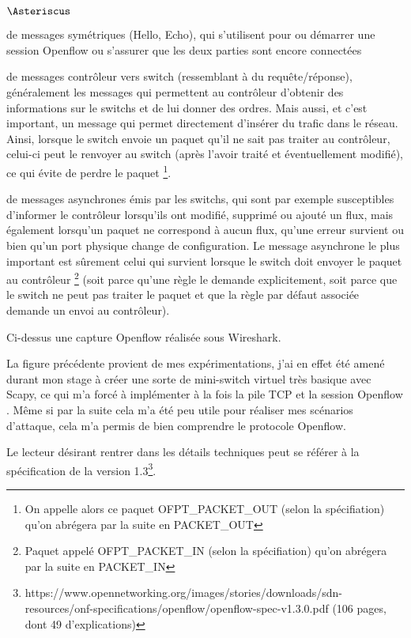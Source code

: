 \begin{list}{$\Asteriscus$}{}

\item de messages symétriques (Hello, Echo), qui s'utilisent pour ou démarrer une session Openflow ou s'assurer que les deux parties sont encore connectées

\item de messages contrôleur vers switch (ressemblant à du requête/réponse), généralement les messages qui permettent au contrôleur d'obtenir des informations sur le switchs et de lui donner des ordres. Mais aussi, et c'est important, un message qui permet directement d'insérer du trafic dans le réseau. Ainsi, lorsque le switch envoie un paquet qu'il ne sait pas traiter au contrôleur, celui-ci peut le renvoyer au switch (après l'avoir traité et éventuellement modifié), ce qui évite de perdre le paquet \footnote{On appelle alors ce paquet OFPT\_PACKET\_OUT (selon la spécifiation) qu'on abrégera par la suite en PACKET\_OUT}.

\item de messages asynchrones émis par les switchs, qui sont par exemple susceptibles d'informer le contrôleur lorsqu'ils ont modifié, supprimé ou ajouté un flux, mais également lorsqu'un paquet ne correspond à aucun flux, qu'une erreur survient ou bien qu'un port physique change de configuration. Le message asynchrone le plus important est sûrement celui qui survient lorsque le switch doit envoyer le paquet au contrôleur \footnote{Paquet appelé OFPT\_PACKET\_IN (selon la spécifiation) qu'on abrégera par la suite en PACKET\_IN} (soit parce qu'une règle le demande explicitement, soit parce que le switch ne peut pas traiter le paquet et que la règle par défaut associée demande un envoi au contrôleur).

\end{list}

Ci-dessus une capture Openflow réalisée sous Wireshark.

La figure précédente provient de mes expérimentations, j'ai en effet été amené durant mon stage à créer une sorte de mini-switch virtuel très basique avec Scapy, ce qui m'a forcé à implémenter à la fois la pile TCP et la session Openflow . Même si par la suite cela m'a été peu utile pour réaliser mes scénarios d'attaque, cela m'a permis de bien comprendre le protocole Openflow.

Le lecteur désirant rentrer dans les détails techniques peut se référer à la spécification de la version 1.3\footnote{\label{OF_13}https://www.opennetworking.org/images/stories/downloads/sdn-resources/onf-specifications/openflow/openflow-spec-v1.3.0.pdf (106 pages, dont 49 d'explications)}.